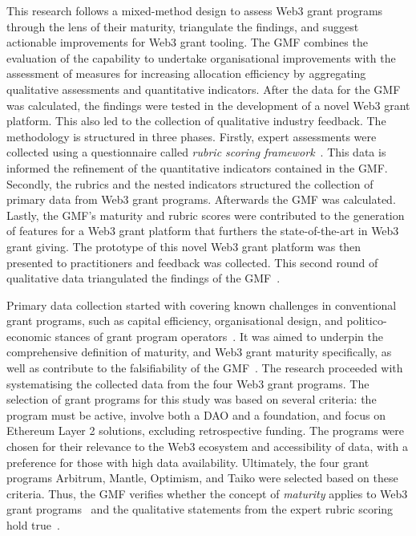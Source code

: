 \documentclass[conference]{IEEEtran}
\begin{document}
This research follows a mixed-method design to assess Web3 grant programs through the lens of their maturity, triangulate the findings, and suggest actionable improvements for Web3 grant tooling. The GMF combines the evaluation of the capability to undertake organisational improvements with the assessment of measures for increasing allocation efficiency by aggregating qualitative assessments and quantitative indicators. After the data for the GMF was calculated, the findings were tested in the development of a novel Web3 grant platform. This also led to the collection of qualitative industry feedback. The methodology is structured in three phases. Firstly, expert assessments were collected using a questionnaire called \textit{rubric scoring framework}~\cite{biedermann_evaluating_2024}. This data is informed the refinement of the quantitative indicators contained in the GMF. Secondly, the rubrics and the nested indicators structured the collection of primary data from Web3 grant programs. Afterwards the GMF was calculated. Lastly, the GMF's maturity and rubric scores were contributed to the generation of features for a Web3 grant platform that furthers the state-of-the-art in Web3 grant giving. The prototype of this novel Web3 grant platform was then presented to practitioners and feedback was collected. This second round of qualitative data triangulated the findings of the GMF~\cite{creswell_designing_2017,datta_paradigm_2006}.

Primary data collection started with covering known challenges in conventional grant programs, such as capital efficiency, organisational design, and politico-economic stances of grant program operators~\cite{lerner_government_2000}. It was aimed to underpin the comprehensive definition of maturity, and Web3 grant maturity specifically, as well as contribute to the falsifiability of the GMF~\cite[p.~17]{popper_objective_1973}. The research proceeded with systematising the collected data from the four Web3 grant programs. The selection of grant programs for this study was based on several criteria: the program must be active, involve both a DAO and a foundation, and focus on Ethereum Layer 2 solutions, excluding retrospective funding. The programs were chosen for their relevance to the Web3 ecosystem and accessibility of data, with a preference for those with high data availability. Ultimately, the four grant programs Arbitrum, Mantle, Optimism, and Taiko were selected based on these criteria. Thus, the GMF verifies whether the concept of \textit{maturity} applies to Web3 grant programs~\cite[p.~7]{santos_dao_2018} and the qualitative statements from the expert rubric scoring hold true~\cite{hutton_abstraction_1990}.
\end{document}

